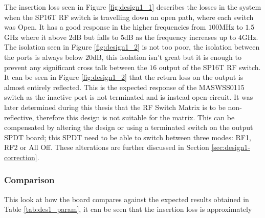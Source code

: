 \documentclass[12pt,openany,a4paper]{book}
\begin{document}
The insertion loss seen in Figure \ref{fig:design1_1} describes the losses in the system when the SP16T RF switch is travelling down an open path, where each switch was Open. It has a good response in the higher frequencies from $100$MHz to $1.5$GHz where it above $2$dB but falls to $5$dB as the frequency increases up to $4$GHz. The isolation seen in Figure \ref{fig:design1_2} is not too poor, the
 isolation between the ports is always below $20$dB, this isolation isn't great but it is enough to prevent any significant cross talk between the $16$ output of the SP16T RF switch. \\
It can be seen in Figure \ref{fig:design1_2} that the return loss on the output is almost entirely reflected. This is the expected response of the MASWSS0115 switch as the inactive port is not terminated and is instead open-circuit. It was later determined during this thesis that the RF Switch Matrix is to be non-reflective, therefore this design is not suitable for the matrix. This can be compensated by altering the design or using a terminated switch on the output SPDT board; this SPDT need to be able to switch between three modes: RF1, RF2 or All Off. These alterations are further discussed in Section \ref{sec:design1-correction}.


\subsubsection{Comparison}
This look at how the board compares against the expected results obtained in Table \ref{tab:des1_param}, it can be seen that the insertion loss is approximately %
\end{document}
